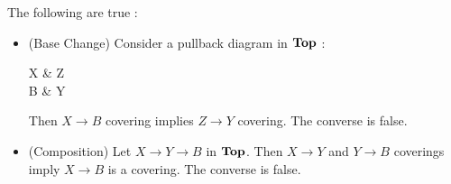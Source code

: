 \documentclass[./main.tex]{subfiles}
\begin{document}
\begin{prop}
  
  The following are true : 
  \begin{itemize}
    \item (Base Change) 
    Consider a pullback diagram in $\mathbf{Top}$ : 
    \begin{cd}
      X \ar[d]
        & Z \ar[d] \ar[l] \\
      B 
        & Y \ar[l]
    \end{cd}
    Then $X \to B$ covering implies $Z \to Y$ covering. 
    The converse is false. 
    \item (Composition)
    Let $X \to Y \to B$ in $\mathbf{Top}$.
    Then $X \to Y$ and $Y \to B$ coverings
    imply $X \to B$ is a covering. 
    The converse is false. 
    \end{itemize}
  
\end{prop}
\end{document}
